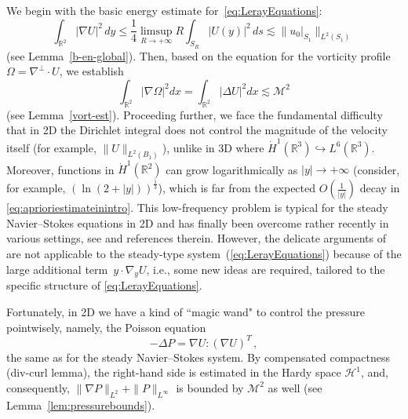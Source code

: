 \documentclass[12pt,reqno]{amsart}
\theoremstyle{plain}
\theoremstyle{definition}
\newcommand{\R}{\mathbb{R}}
\newcommand{\M}{\mathcal{M}}
\renewcommand{\:}{\colon}
\numberwithin{equation}{section}
\numberwithin{figure}{section}
\begin{document}
We begin with the basic energy estimate for~\eqref{eq:LerayEquations}:
\begin{equation} \label{eq:Dirichletenergyinintro}
	\int_{\R^2} |\nabla U|^2 \, dy \leq \frac{1}{4} \limsup_{R \to +\infty} R \int_{S_R} |U(y)|^2 \, ds \lesssim \| u_0|_{S_1} \|_{L^2(S_1)} \, 
\end{equation}
(see Lemma~\ref{b-en-global}). 
Then, based on the equation for the vorticity profile~$\Omega=\nabla^\perp \cdot U$, we establish
\begin{equation}
 \label{vet-1}
			\int_{\R^2} |\nabla\Omega|^2 dx=\int_{\R^2} |\Delta U|^2 dx \lesssim \M^2
		\end{equation}
(see Lemma~\ref{vort-est}). Proceeding further, we face the fundamental difficulty that in 2D the Dirichlet integral  does not control the  magnitude of the velocity itself (for example, $\|U\|_{L^2(B_1)}$), unlike in 3D where $\dot H^1(\R^3) \hookrightarrow L^6(\R^3)$. Moreover, functions in $\dot H^1(\R^2)$ can grow logarithmically as $|y| \to +\infty$ (consider, for example, $(\ln (2+|y|))^\frac13$), which is far from the expected $O(\frac{1}{|y|})$ decay in \eqref{eq:aprioriestimateinintro}. This low-frequency problem is typical for the steady Navier--Stokes equations in 2D \cite{GaldiBook} and has finally been overcome rather recently in various settings, see \cite{GKR23,korob-ren25} and references therein. However, the delicate arguments of \cite{GKR23,korob-ren25} are not  applicable to the steady-type system~(\ref{eq:LerayEquations}) because of the large additional term~$y \cdot \nabla_y U$, i.e.,  some new ideas are required, tailored to the  specific structure of \eqref{eq:LerayEquations}. 

Fortunately, in 2D we have a kind of ``magic wand" to control the pressure pointwisely, namely, the Poisson equation
\begin{equation}
    - \Delta P = \nabla U : (\nabla U)^T \, ,
\end{equation}
the same as for the steady Navier--Stokes system. By compensated compactness (div-curl lemma),
 the right-hand side  is estimated in the Hardy space $\mathcal{H}^1$, and, consequently, $\|\nabla P\|_{L^2}+\|P\|_{L^\infty}$ is bounded by $\M^2$ as well (see Lemma~\ref{lem:pressurebounds}).
 
\end{document}
